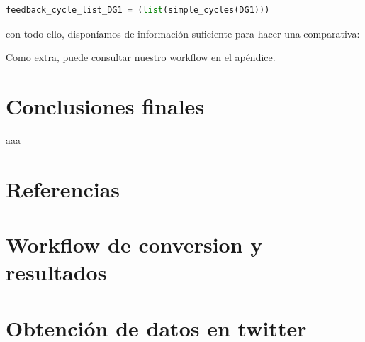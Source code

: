 \documentclass[1p]{elsarticle}
\begin{document}
\begin{lstlisting}[language=Python]
feedback_cycle_list_DG1 = (list(simple_cycles(DG1)))\end{lstlisting}
 
con todo ello, disponíamos de información suficiente para hacer una comparativa:



Como extra, puede consultar nuestro workflow en el apéndice.



\section{Conclusiones finales}
aaa



\section*{Referencias}


\begin{appendices}
	
	\section{Workflow de conversion y resultados}
	
\section{Obtención de datos en twitter}

\end{appendices}
\end{document}

